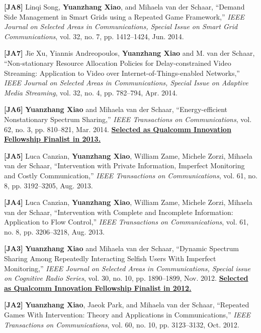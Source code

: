 \documentclass[margin,line]{res}
\begin{document}
\begin{resume}
\textbf{[JA8]} Linqi Song, {\bf Yuanzhang Xiao}, and Mihaela van der Schaar, ``Demand Side Management in Smart Grids using a Repeated Game Framework,''
\emph{IEEE Journal on Selected Areas in Communications, Special Issue on Smart Grid Communications}, vol. 32, no. 7, pp. 1412--1424, Jun. 2014.

\textbf{[JA7]} Jie Xu, Yiannis Andreopoulos, {\bf Yuanzhang Xiao} and M. van der Schaar, ``Non-stationary Resource Allocation Policies for Delay-constrained Video Streaming: Application to Video over Internet-of-Things-enabled Networks,'' \emph{IEEE Journal on Selected Areas in Communications, Special Issue on Adaptive Media Streaming}, vol. 32, no. 4, pp. 782--794, Apr. 2014.

\textbf{[JA6]} {\bf Yuanzhang Xiao} and Mihaela van der Schaar, ``Energy-efficient Nonstationary Spectrum Sharing,'' \emph{IEEE Transactions on Communications}, vol. 62, no. 3, pp. 810--821, Mar. 2014. \href{https://www.qualcomm.com/invention/research/university-relations/innovation-fellowship/finalists}
{\textbf{Selected as Qualcomm Innovation Fellowship Finalist in 2013.}}

\textbf{[JA5]} Luca Canzian, {\bf Yuanzhang Xiao}, William Zame, Michele Zorzi, Mihaela van der Schaar, ``Intervention with Private Information, Imperfect Monitoring and Costly Communication,'' \emph{IEEE Transactions on Communications}, vol. 61, no. 8, pp. 3192--3205, Aug. 2013.

\textbf{[JA4]} Luca Canzian, {\bf Yuanzhang Xiao}, William Zame, Michele Zorzi, Mihaela van der Schaar, ``Intervention with Complete and Incomplete Information: Application to Flow Control,''  \emph{IEEE Transactions on Communications}, vol. 61, no. 8, pp. 3206--3218, Aug. 2013.

\textbf{[JA3]} {\bf Yuanzhang Xiao} and Mihaela van der Schaar, ``Dynamic Spectrum Sharing Among Repeatedly Interacting Selfish Users With Imperfect Monitoring,'' \emph{IEEE Journal on Selected Areas in Communications, Special issue on Cognitive Radio Series}, vol. 30, no. 10, pp. 1890--1899, Nov. 2012.
\href{https://www.qualcomm.com/invention/research/university-relations/innovation-fellowship/finalists}
{\textbf{Selected as Qualcomm Innovation Fellowship Finalist in 2012.}}

\textbf{[JA2]} {\bf Yuanzhang Xiao}, Jaeok Park, and Mihaela van der Schaar, ``Repeated Games With Intervention: Theory and Applications in Communications,'' \emph{IEEE Transactions on Communications}, vol. 60, no. 10, pp. 3123--3132, Oct. 2012.


\end{resume}
\end{document}
